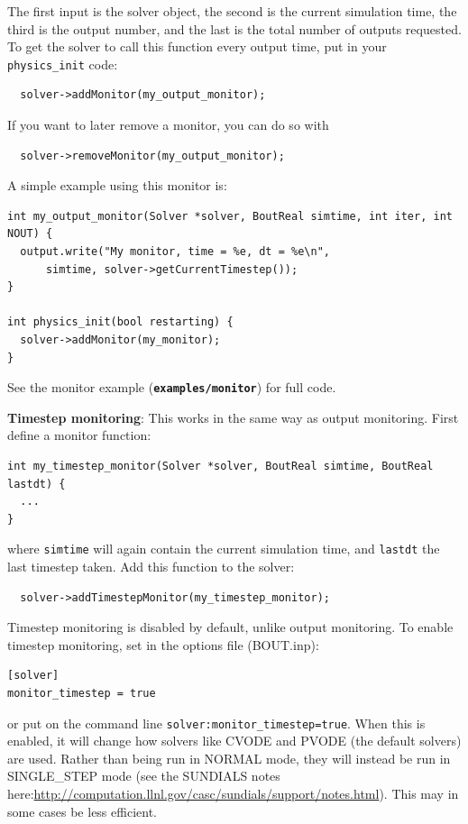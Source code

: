 \documentclass[12pt]{article}
\newcommand{\file}[1]{\texttt{\bf #1}}
\begin{document}
The first input is the solver object, the second is the current simulation time, the third is the output number, and the last is the total number of outputs requested. To get the solver to call this function every output time, put in your \lstinline!physics_init! code:
\begin{lstlisting}
  solver->addMonitor(my_output_monitor);
\end{lstlisting}
If you want to later remove a monitor, you can do so with
\begin{lstlisting}
  solver->removeMonitor(my_output_monitor);
\end{lstlisting}

A simple example using this monitor is:
\begin{lstlisting}
int my_output_monitor(Solver *solver, BoutReal simtime, int iter, int NOUT) {
  output.write("My monitor, time = %e, dt = %e\n",
      simtime, solver->getCurrentTimestep());
}

int physics_init(bool restarting) {
  solver->addMonitor(my_monitor);
}
\end{lstlisting}

See the monitor example (\file{examples/monitor}) for full code.


{\bf Timestep monitoring}: This works in the same way as output monitoring. First define a monitor function:
\begin{lstlisting}
int my_timestep_monitor(Solver *solver, BoutReal simtime, BoutReal lastdt) {
  ...
}
\end{lstlisting}
where \lstinline!simtime! will again contain the current simulation time, and \lstinline!lastdt! the last
timestep taken. Add this function to the solver:
\begin{lstlisting}
  solver->addTimestepMonitor(my_timestep_monitor);
\end{lstlisting}
Timestep monitoring is disabled by default, unlike output monitoring. To enable timestep monitoring, set in
the options file (BOUT.inp):
\begin{lstlisting}
[solver]
monitor_timestep = true
\end{lstlisting}
or put on the command line \lstinline!solver:monitor_timestep=true!. When this is enabled, it will
change how solvers like CVODE and PVODE (the default solvers) are used. Rather than being run in NORMAL
mode, they will instead be run in SINGLE\_STEP mode (see the SUNDIALS notes here:\url{http://computation.llnl.gov/casc/sundials/support/notes.html}). This may in some cases be less efficient.
\end{document}
